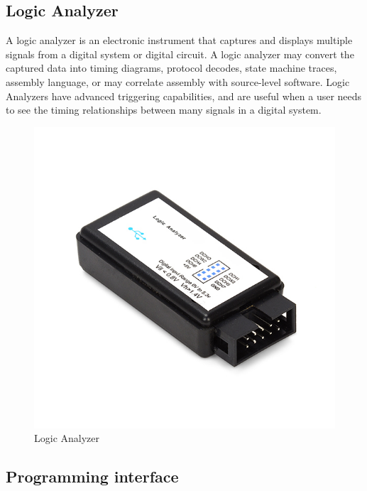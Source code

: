 \subsection{Logic Analyzer}
A logic analyzer is an electronic instrument that captures and displays multiple signals from a digital system or digital circuit. A logic analyzer may convert the captured data into timing diagrams, protocol decodes, state machine traces, assembly language, or may correlate assembly with source-level software. Logic Analyzers have advanced triggering capabilities, and are useful when a user needs to see the timing relationships between many signals in a digital system.\\
\begin{figure}[ht]
	\centering
	\includegraphics[scale=0.45]{images/logic_analyzer.png}
	\caption{Logic Analyzer}
\end{figure}
\subsection{Programming interface}
